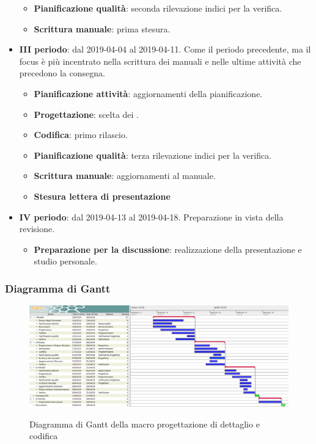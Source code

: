 \begin{itemize}
\begin{itemize}
    	        \item \textbf{Pianificazione qualità}: seconda rilevazione indici per la verifica.
    	        \item \textbf{Scrittura manuale}: prima stesura.
        	\end{itemize}
        	\item \textbf{III periodo}: dal 2019-04-04 al 2019-04-11. Come il periodo precedente, ma il focus è più incentrato nella
				scrittura dei manuali e nelle ultime attività che precedono la consegna.
			\begin{itemize}
				\item \textbf{Pianificazione attività}: aggiornamenti della pianificazione.
    	        \item \textbf{Progettazione}: scelta dei .
    	        \item \textbf{Codifica}: primo rilascio.
    	        \item \textbf{Pianificazione qualità}: terza rilevazione indici per la verifica.
    	        \item \textbf{Scrittura manuale}: aggiornamenti al manuale.
    	        \item \textbf{Stesura lettera di presentazione}
        	\end{itemize}
        	\item \textbf{IV periodo}: dal 2019-04-13 al 2019-04-18. Preparazione in vista della revisione.
			\begin{itemize}
				\item \textbf{Preparazione per la discussione}: realizzazione della presentazione e studio personale.
        	\end{itemize}
        \end{itemize}

        \begin{landscape}
			\subsubsection{Diagramma di Gantt}
			\begin{figure}[H]
					\centering
					\includegraphics[scale=0.42]{img/Progettazione_di_dettaglio_e_codifica.png}\\
					\caption{Diagramma di Gantt della macro progettazione di dettaglio e codifica}
			\end{figure}
		\end{landscape}
		\newpage

